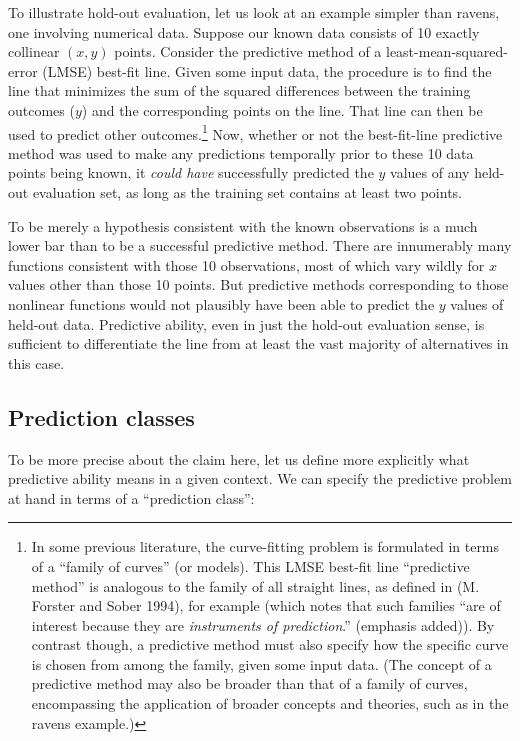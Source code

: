 \documentclass[
  letterpaper,
  DIV=11,
  numbers=noendperiod]{scrartcl}
\theoremstyle{definition}
\theoremstyle{remark}
\begin{document}
To illustrate hold-out evaluation, let us look at an example simpler
than ravens, one involving numerical data. Suppose our known data
consists of 10 exactly collinear \((x, y)\) points. Consider the
predictive method of a least-mean-squared-error (LMSE) best-fit line.
Given some input data, the procedure is to find the line that minimizes
the sum of the squared differences between the training outcomes (\(y\))
and the corresponding points on the line. That line can then be used to
predict other outcomes.\footnote{In some previous literature, the
  curve-fitting problem is formulated in terms of a ``family of curves''
  (or models). This LMSE best-fit line ``predictive method'' is
  analogous to the family of all straight lines, as defined in (M.
  Forster and Sober 1994), for example (which notes that such families
  ``are of interest because they are \emph{instruments of prediction}.''
  (emphasis added)). By contrast though, a predictive method must also
  specify how the specific curve is chosen from among the family, given
  some input data. (The concept of a predictive method may also be
  broader than that of a family of curves, encompassing the application
  of broader concepts and theories, such as in the ravens example.)}
Now, whether or not the best-fit-line predictive method was used to make
any predictions temporally prior to these 10 data points being known, it
\emph{could have} successfully predicted the \(y\) values of any
held-out evaluation set, as long as the training set contains at least
two points.

To be merely a hypothesis consistent with the known observations is a
much lower bar than to be a successful predictive method. There are
innumerably many functions consistent with those 10 observations, most
of which vary wildly for \(x\) values other than those 10 points. But
predictive methods corresponding to those nonlinear functions would not
plausibly have been able to predict the \(y\) values of held-out data.
Predictive ability, even in just the hold-out evaluation sense, is
sufficient to differentiate the line from at least the vast majority of
alternatives in this case.

\subsection{Prediction classes}\label{prediction-classes}

To be more precise about the claim here, let us define more explicitly
what predictive ability means in a given context. We can specify the
predictive problem at hand in terms of a ``prediction class'':
\end{document}
